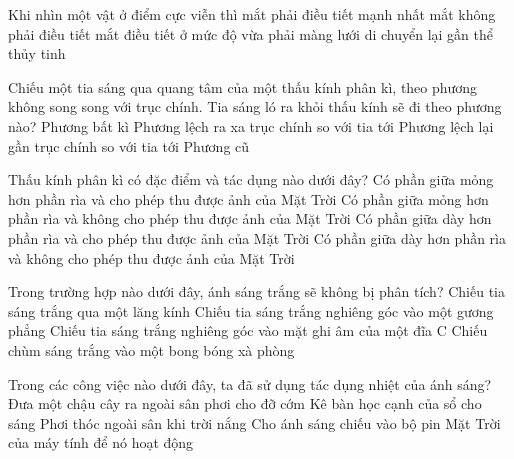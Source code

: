 \begin{ex}
	Khi nhìn một vật ở điểm cực viễn thì
	\choice
	{mắt phải điều tiết mạnh nhất}
	{\True mắt không phải điều tiết}
	{mắt điều tiết ở mức độ vừa phải}
	{màng lưới di chuyển lại gần thể thủy tinh}
	\loigiai{}
\end{ex}

\begin{ex}
	Chiếu một tia sáng qua quang tâm của một thấu kính phân kì, theo phương không song song với trục chính. Tia sáng ló ra khỏi thấu kính sẽ đi theo phương nào?
	\choice
	{Phương bất kì}
	{Phương lệch ra xa trục chính so với tia tới}
	{Phương lệch lại gần trục chính so với tia tới}
	{\True Phương cũ}
	\loigiai{}
\end{ex}

\begin{ex}
	Thấu kính phân kì có đặc điểm và tác dụng nào dưới đây?
	\choice
	{Có phần giữa mỏng hơn phần rìa và cho phép thu được ảnh của Mặt Trời}
	{\True Có phần giữa mỏng hơn phần rìa và không cho phép thu được ảnh của Mặt Trời}
	{Có phần giữa dày hơn phần rìa và cho phép thu được ảnh của Mặt Trời}
	{Có phần giữa dày hơn phần rìa và không cho phép thu được ảnh của Mặt Trời}
	\loigiai{}
\end{ex}

\begin{ex}
	Trong trường hợp nào dưới đây, ánh sáng trắng sẽ không bị phân tích?
	\choice
	{Chiếu tia sáng trắng qua một lăng kính}
	{\True Chiếu tia sáng trắng nghiêng góc vào một gương phẳng}
	{Chiếu tia sáng trắng nghiêng góc vào mặt ghi âm của một đĩa C}
	{Chiếu chùm sáng trắng vào một bong bóng xà phòng}
	\loigiai{}
\end{ex}

\begin{ex}
	Trong các công việc nào dưới đây, ta đã sử dụng tác dụng nhiệt của ánh sáng?
	\choice
	{Đưa một chậu cây ra ngoài sân phơi cho đỡ cớm}
	{Kê bàn học cạnh của sổ cho sáng}
	{\True Phơi thóc ngoài sân khi trời nắng}
	{Cho ánh sáng chiếu vào bộ pin Mặt Trời của máy tính để nó hoạt động}
	\loigiai{}
\end{ex}





